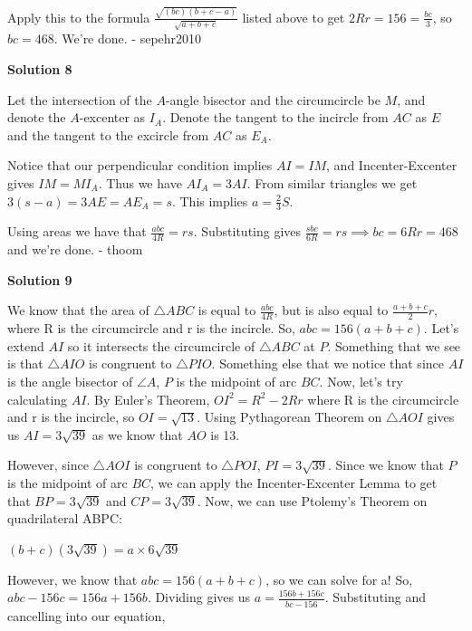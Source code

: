 \begin{enumerate}
 Apply this to the formula $\frac{\sqrt{(bc)(b+c-a)}}{\sqrt{a+b+c}}$ listed above to get $2Rr = 156 = \frac{bc}{3}$, so $bc = 468$. We're done. - sepehr2010

 



\textbf{Solution 8}

Let the intersection of the $A$-angle bisector and the circumcircle be $M$, and denote the $A$-excenter as $I_A$. Denote the tangent to the incircle from $AC$ as $E$ and the tangent to the excircle from $AC$ as $E_A$.

 Notice that our perpendicular condition implies $AI = IM$, and Incenter-Excenter gives $IM = MI_A$. Thus we have $AI_A = 3AI$. From similar triangles we get $3(s-a) = 3AE = AE_A = s$. This implies $a = \frac23 S$.

 Using areas we have that $\frac{abc}{4R} = rs$. Substituting gives $\frac{sbc}{6R} = rs \implies bc = 6Rr = \boxed{468}$ and we're done. - thoom

 



\textbf{Solution 9}

We know that the area of $\triangle{ABC}$ is equal to $\frac{abc}{4R}$, but is also equal to $\frac{a+b+c}{2}r$, where R is the circumcircle and r is the incircle. So, $abc = 156(a+b+c)$. Let's extend $AI$ so it intersects the circumcircle of $\triangle{ABC}$ at $P$. Something that we see is that $\triangle{AIO}$ is congruent to $\triangle{PIO}$. Something else that we notice that since $AI$ is the angle bisector of $\angle{A}$, $P$ is the midpoint of arc $BC$. Now, let's try calculating $AI$. By Euler's Theorem, $OI^{2} = R^{2} - 2Rr$ where R is the circumcircle and r is the incircle, so $OI = \sqrt{13}$. Using Pythagorean Theorem on $\triangle{AOI}$ gives us $AI = 3\sqrt{39}$ as we know that $AO$ is 13.

 However, since $\triangle{AOI}$ is congruent to $\triangle{POI}$, $PI = 3\sqrt{39}$. Since we know that $P$ is the midpoint of arc $BC$, we can apply the Incenter-Excenter Lemma to get that $BP = 3\sqrt{39}$ and $CP = 3\sqrt{39}$. Now, we can use Ptolemy's Theorem on quadrilateral ABPC:

 $(b+c)(3\sqrt{39}) = a \times 6\sqrt{39}$

 However, we know that $abc = 156(a+b+c)$, so we can solve for a! So, $abc - 156c = 156a + 156b$. Dividing gives us $a = \frac{156b + 156c}{bc - 156}$. Substituting and cancelling into our equation,


\end{enumerate}
